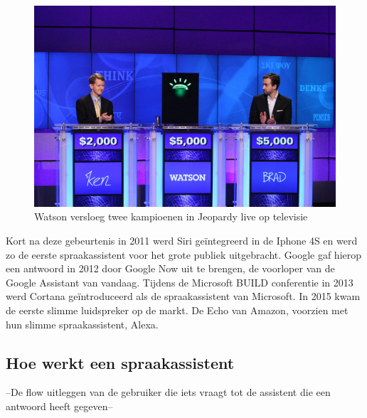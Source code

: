 \begin{figure}[h]
    \includegraphics[width=0.7\linewidth]{img/WatsonJeopardy}
    \caption{Watson versloeg twee kampioenen in Jeopardy live op televisie \autocite{Markoff2011}}
    \label{fig:watson}
\end{figure}

Kort na deze gebeurtenis in 2011 werd Siri geïntegreerd in de Iphone 4S en werd zo de eerste spraakassistent voor het grote publiek uitgebracht. Google gaf hierop een antwoord in 2012 door Google Now uit te brengen, de voorloper van de Google Assistant van vandaag. Tijdens de Microsoft BUILD conferentie in 2013 werd Cortana geïntroduceerd als de spraakassistent van Microsoft. In 2015 kwam de eerste slimme luidspreker op de markt. De Echo van Amazon, voorzien met hun slimme spraakassistent, Alexa.

\subsection{Hoe werkt een spraakassistent}
--De flow uitleggen van de gebruiker die iets vraagt tot de assistent die een antwoord heeft gegeven--

